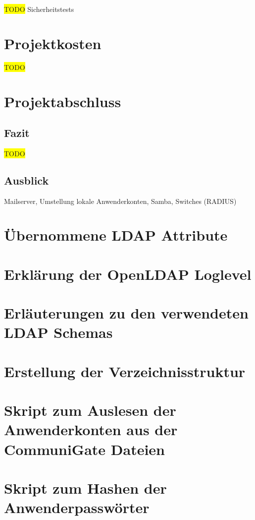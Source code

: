 \documentclass[11pt,a4paper,titlepage=firstiscover]{scrartcl} %
\newcommand{\hilight}[1]{\colorbox{yellow}{#1}} %
\begin{document}
\medskip \noindent \hilight{TODO} Sicherheitstests


\section{Projektkosten}
\hilight{TODO}

\section{Projektabschluss}
\subsection{Fazit}
\hilight{TODO}

\subsection{Ausblick}
Mailserver, Umstellung lokale Anwenderkonten, Samba, Switches (RADIUS)


\appendix
{} %
\newpage
\section{Übernommene LDAP Attribute} \label{sec:LDAP-Attribute}
\newpage
\section{Erklärung der OpenLDAP Loglevel} \label{sec:LDAP-Loglevel}
\newpage
\section{Erläuterungen zu den verwendeten LDAP Schemas}\label{sec:LDAP-Schema}
\newpage
\section{Erstellung der Verzeichnisstruktur}\label{sec:Erstelle-DB}
\newpage
\section{Skript zum Auslesen der Anwenderkonten aus der CommuniGate Dateien}\label{sec:SkriptA}
\newpage
\section{Skript zum Hashen der Anwenderpasswörter}\label{sec:SkriptB}
\newpage
\end{document}
